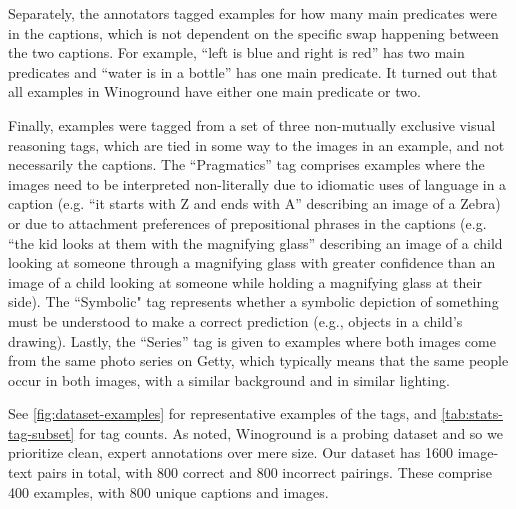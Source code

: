 \documentclass[10pt,twocolumn,letterpaper]{article}
\begin{document}
Separately, the annotators tagged examples for how many main predicates were in the captions, which is not dependent on the specific swap happening between the two captions. For example, ``left is blue and right is red'' has two main predicates and ``water is in a bottle'' has one main predicate. It turned out that all examples in Winoground have either one main predicate or two.

Finally, examples were tagged from a set of three non-mutually exclusive visual reasoning tags, which are tied in some way to the images in an example, and not necessarily the captions. The ``Pragmatics'' tag comprises examples where the images need to be interpreted non-literally due to idiomatic uses of language in a caption (e.g. ``it starts with Z and ends with A'' describing an image of a Zebra) or due to attachment preferences of prepositional phrases in the captions (e.g. ``the kid looks at them with the magnifying glass'' describing an image of a child looking at someone through a magnifying glass with greater confidence than an image of a child looking at someone while holding a magnifying glass at their side). The ``Symbolic" tag represents whether a symbolic depiction of something must be understood to make a correct prediction (e.g., objects in a child's drawing). Lastly, the ``Series'' tag is given to examples where both images come from the same photo series on Getty, which typically means that the same people occur in both images, with a similar background and in similar lighting.

See \cref{fig:dataset-examples} for representative examples of the tags, and \cref{tab:stats-tag-subset} for tag counts. As noted, Winoground is a probing dataset and so we prioritize clean, expert annotations over mere size. Our dataset has 1600 image-text pairs in total, with 800 correct and 800 incorrect pairings. These comprise 400 examples, with 800 unique captions and images.
\end{document}
